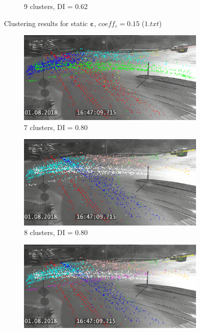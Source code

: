 \begin{figure}[!htb]
\begin{subfigure}[!htb]{0.495\textwidth}
		\caption{9 clusters, DI = 0.62}
		\label{fig:1-9cl-015}
	\end{subfigure}
	\caption{Clustering results for static $\bm{\varepsilon}$, $coeff_\varepsilon = 0.15$ ($1.txt$)}
	\label{fig:clust-res-1-015}
\end{figure}

\begin{figure}[!htb]
	\centering
	\begin{subfigure}[!htb]{0.495\textwidth}
		\centering{}
		\includegraphics[width=\textwidth]{images/cl-res/2-7cl-01.png}
		\caption{7 clusters, DI = 0.80}
		\label{fig:2-7cl-01}
	\end{subfigure}
	\hfill
	\begin{subfigure}[!htb]{0.495\textwidth}
		\centering{}
		\includegraphics[width=\textwidth]{images/cl-res/2-8cl-01.png}
		\caption{8 clusters, DI = 0.80}
		\label{fig:2-8cl-01}
	\end{subfigure}
	\hfill
	\begin{subfigure}[!htb]{0.495\textwidth}
		\centering{}
		\includegraphics[width=\textwidth]{images/cl-res/2-9cl-01.png}

\end{subfigure}
\end{figure}
